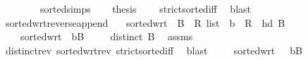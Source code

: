\begin{isabellebody}
\ \ \ \ \ \ \ \ sorted{\isacharunderscore}{\kern0pt}simps{\isacharparenleft}{\kern0pt}{}{\isacharparenright}{\kern0pt}{\isacharparenright}{\kern0pt}\isanewline
\ \ \isamarkupfalse%
\ {\isacharquery}{\kern0pt}thesis\ \isamarkupfalse%
\ {}\ {}\ strict{\isacharunderscore}{\kern0pt}sorted{\isacharunderscore}{\kern0pt}iff\ \isamarkupfalse%
\ blast\isanewline
{}\isamarkupfalse%
%
\endisatagproof
{\isafoldproof}%
%
\isadelimproof
\isanewline
%
\endisadelimproof
\isanewline
{}\isamarkupfalse%
\ sorted{\isacharunderscore}{\kern0pt}wrt{\isacharunderscore}{\kern0pt}reverse{\isacharunderscore}{\kern0pt}append{\isacharcolon}{\kern0pt}\isanewline
\ \ \ {\isachardoublequoteopen}sorted{\isacharunderscore}{\kern0pt}wrt\ {\isacharparenleft}{\kern0pt}{\isachargreater}{\kern0pt}{\isacharparenright}{\kern0pt}\ {\isacharparenleft}{\kern0pt}B\ {\isacharcolon}{\kern0pt}{\isacharcolon}{\kern0pt}\ R{}\ list{\isacharparenright}{\kern0pt}{\isachardoublequoteclose}\ \ {\isachardoublequoteopen}{\isacharparenleft}{\kern0pt}b\ {\isacharcolon}{\kern0pt}{\isacharcolon}{\kern0pt}\ R{}{\isacharparenright}{\kern0pt}\ {\isachargreater}{\kern0pt}\ {\isacharparenleft}{\kern0pt}hd\ B{\isacharparenright}{\kern0pt}{\isachardoublequoteclose}\isanewline
\ \ \ \ {\isachardoublequoteopen}sorted{\isacharunderscore}{\kern0pt}wrt\ {\isacharparenleft}{\kern0pt}{\isachargreater}{\kern0pt}{\isacharparenright}{\kern0pt}\ {\isacharparenleft}{\kern0pt}b{\isacharhash}{\kern0pt}B{\isacharparenright}{\kern0pt}{\isachardoublequoteclose}\isanewline
%
\isadelimproof
%
\endisadelimproof
%
\isatagproof
{}\isamarkupfalse%
{\isacharminus}{\kern0pt}\isanewline
\ \ \isamarkupfalse%
\ {}{\isacharcolon}{\kern0pt}\ {\isachardoublequoteopen}distinct\ B{\isachardoublequoteclose}\ \isamarkupfalse%
\ assms\isanewline
\ \ \ \ \isamarkupfalse%
\ distinct{\isacharunderscore}{\kern0pt}rev\ sorted{\isacharunderscore}{\kern0pt}wrt{\isacharunderscore}{\kern0pt}rev\ strict{\isacharunderscore}{\kern0pt}sorted{\isacharunderscore}{\kern0pt}iff\ \isamarkupfalse%
\ blast\isanewline
\ \ \isamarkupfalse%
\ {}{\isacharcolon}{\kern0pt}\ {\isachardoublequoteopen}sorted{\isacharunderscore}{\kern0pt}wrt\ {\isacharparenleft}{\kern0pt}{\isachargreater}{\kern0pt}{\isacharparenright}{\kern0pt}\ \ {\isacharparenleft}{\kern0pt}b{\isacharhash}{\kern0pt}B{\isacharparenright}{\kern0pt}{\isachardoublequoteclose}\ \isamarkupfalse%

\end{isabellebody}
